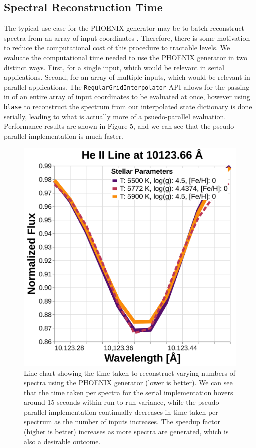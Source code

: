 \documentclass[twocolumn]{aastex631}
\begin{document}
\subsection{Spectral Reconstruction Time}
The typical use case for the PHOENIX generator may be to batch 
reconstruct spectra from an array of input coordinates . Therefore, there
is some motivation to reduce the computational cost of this
procedure to tractable levels. We evaluate the computational time needed
to use the PHOENIX generator in two distinct ways. First, for a single
input, which would be relevant in serial applications. Second, for an array
of multiple inputs, which would be relevant in parallel applications.
The \texttt{RegularGridInterpolator} API allows for the passing in of 
an entire array of input coordinates to be evaluated at once, however 
using \texttt{blase} to reconstruct the spectrum from our interpolated
state dictionary is done serially, leading to what is actually more of 
a psuedo-parallel evaluation. Performance results are shown in Figure 5,
and we can see that the pseudo-parallel implementation is much faster.

\begin{figure}
    \centering
    \includegraphics[width=\columnwidth]{figure5}
    \caption{Line chart showing the time taken to reconstruct varying
    numbers of spectra using the PHOENIX generator (lower is better). 
    We can see that the time taken per spectra for the serial 
    implementation hovers around 15 seconds within run-to-run variance, 
    while the pseudo-parallel implementation continually decreases in time 
    taken per spectrum as the number of inputs increases. The speedup factor 
    (higher is better) increases as more spectra are generated, which is 
    also a desirable outcome.}
\end{figure}
\end{document}
